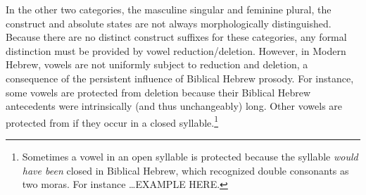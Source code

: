 \begin{description}
In the other two categories, the masculine singular and feminine plural, the construct and absolute states are not always morphologically distinguished. Because there are no distinct construct suffixes for these categories, any formal distinction must be provided by vowel reduction/deletion. However, in Modern Hebrew, vowels are not uniformly subject to reduction and deletion, a consequence of the persistent influence of Biblical Hebrew prosody. For instance, some vowels are protected from deletion because their Biblical Hebrew antecedents were intrinsically (and thus unchangeably) long. Other vowels are protected from if they occur in a closed syllable.\footnote{Sometimes a vowel in an open syllable is protected because the syllable \emph{would have been} closed in Biblical Hebrew, which recognized double consonants as two moras. For instance \dots EXAMPLE HERE.} 


\end{description}
